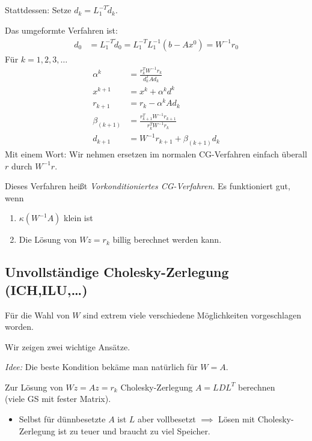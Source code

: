 \bigskip

Stattdessen: Setze $d_k=L_1^{-T} \tilde{d}_k$.

Das umgeformte Verfahren ist:
\begin{align*}
 d_0 & = L_1^{-T} \tilde{d}_0 = L_1^{-T}L_1^{-1} (b-Ax^0)=W^{-1}r_0
\end{align*}
Für $k=1,2,3,\ldots$
\begin{align*}
 \alpha^k & =\frac{r_k^T W^{-1} r_k}{d_k^TAd_k} \\
 x^{k+1} & =x^k+\alpha^kd^k \\
 r_{k+1} & = r_k-\alpha^kAd_k \\
 \beta_{(k+1)} & =\frac{r_{k+1}^T W^{-1} r_{k+1}}{r_k^TW^{-1}r_k} \\
 d_{k+1} & =W^{-1}r_{k+1}+\beta_{(k+1)}d_k
\end{align*}
Mit einem Wort: Wir nehmen ersetzen im normalen CG-Verfahren einfach überall $r$ durch $W^{-1}r$.


Dieses Verfahren heißt \emph{Vorkonditioniertes CG-Verfahren}. Es funktioniert gut, wenn
\begin{enumerate}
 \item $\kappa \left(W^{-1}A \right)$ klein ist
 \item Die Lösung von $Wz=r_k$ billig berechnet werden kann.
\end{enumerate}


\subsection{Unvollständige Cholesky-Zerlegung (ICH,ILU,\ldots)}

Für die Wahl von $W$ sind extrem viele verschiedene Möglichkeiten vorgeschlagen worden.

\medskip

Wir zeigen zwei wichtige Ansätze.

\medskip

\emph{Idee:} Die beste Kondition bekäme man natürlich für $W=A$.

Zur Lösung von $Wz=Az=r_k$ Cholesky-Zerlegung $A=LDL^T$ berechnen \\
(viele GS mit fester Matrix).
\begin{itemize}
 \item Selbst für dünnbesetzte $A$ ist $L$ aber vollbesetzt \newline
 $\implies$ Lösen mit Cholesky-Zerlegung ist zu teuer und braucht zu viel Speicher.
\end{itemize}

